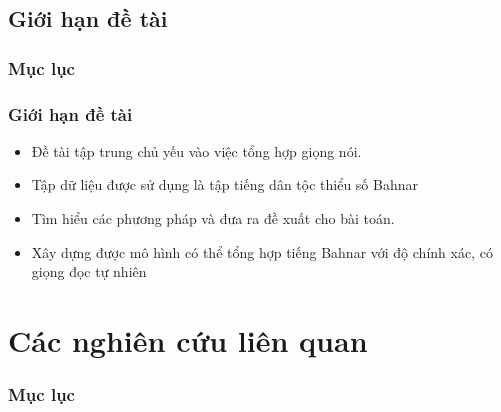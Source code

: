 \documentclass{beamer}
\numberwithin{figure}{section}
\numberwithin{table}{section}
\begin{document}



\subsection{Giới hạn đề tài}
{
    \begin{frame}
        \frametitle{Mục lục}
    \end{frame}
}
\begin{frame}
\frametitle{Giới hạn đề tài}
\begin{itemize}
    \item[--] Đề tài tập trung chủ yếu vào việc tổng hợp giọng nói.
    \item[--] Tập dữ liệu được sử dụng là tập tiếng dân tộc thiểu số Bahnar
    \item[--] Tìm hiểu các phương pháp và đưa ra đề xuất cho bài toán.
    \item[--] Xây dựng được mô hình có thể tổng hợp tiếng Bahnar với độ chính xác, có giọng đọc tự nhiên

\end{itemize}
\end{frame}





\section{Các nghiên cứu liên quan}
{
    \begin{frame}
        \frametitle{Mục lục}
        \tableofcontents[currentsection]
    \end{frame}
}
\end{document}
